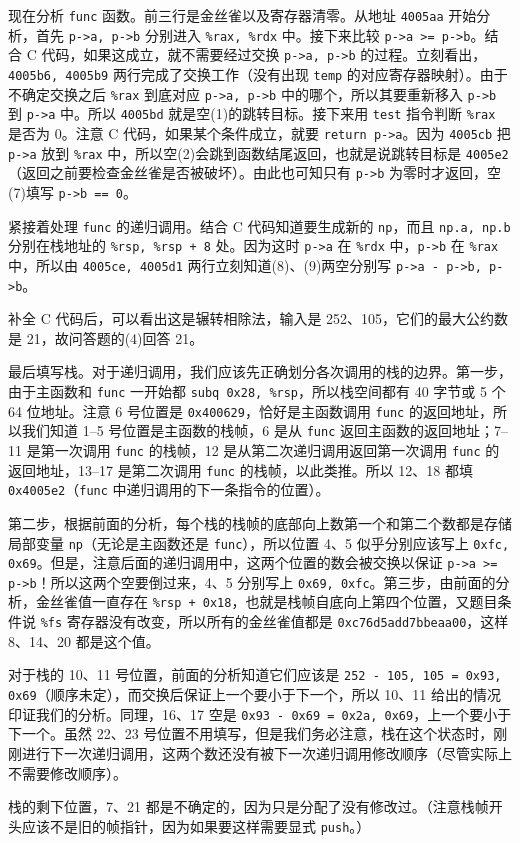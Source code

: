 \begin{problems}
        现在分析 \verb|func| 函数。前三行是金丝雀以及寄存器清零。从地址 \verb|4005aa| 开始分析，首先 \verb|p->a, p->b| 分别进入 \verb|%rax, %rdx| 中。接下来比较 \verb|p->a >= p->b|。结合 C 代码，如果这成立，就不需要经过交换 \verb|p->a, p->b| 的过程。立刻看出，\verb|4005b6, 4005b9| 两行完成了交换工作（没有出现 \verb|temp| 的对应寄存器映射）。由于不确定交换之后 \verb|%rax| 到底对应 \verb|p->a, p->b| 中的哪个，所以其要重新移入 \verb|p->b| 到 \verb|p->a| 中。所以 \verb|4005bd| 就是空(1)的跳转目标。接下来用 \verb|test| 指令判断 \verb|%rax| 是否为 0。注意 C 代码，如果某个条件成立，就要 \verb|return p->a|。因为 \verb|4005cb| 把 \verb|p->a| 放到 \verb|%rax| 中，所以空(2)会跳到函数结尾返回，也就是说跳转目标是 \verb|4005e2|（返回之前要检查金丝雀是否被破坏）。由此也可知只有 \verb|p->b| 为零时才返回，空(7)填写 \verb|p->b == 0|。

        紧接着处理 \verb|func| 的递归调用。结合 C 代码知道要生成新的 \verb|np|，而且 \verb|np.a, np.b| 分别在栈地址的 \verb|%rsp, %rsp + 8| 处。因为这时 \verb|p->a| 在 \verb|%rdx| 中，\verb|p->b| 在 \verb|%rax| 中，所以由 \verb|4005ce, 4005d1| 两行立刻知道(8)、(9)两空分别写 \verb|p->a - p->b, p->b|。

        补全 C 代码后，可以看出这是辗转相除法，输入是 252、105，它们的最大公约数是 21，故问答题的(4)回答 21。

        最后填写栈。对于递归调用，我们应该先正确划分各次调用的栈的边界。第一步，由于主函数和 \verb|func| 一开始都 \verb|subq 0x28, %rsp|，所以栈空间都有 40 字节或 5 个 64 位地址。注意 6 号位置是 \verb|0x400629|，恰好是主函数调用 \verb|func| 的返回地址，所以我们知道 1--5 号位置是主函数的栈帧，6 是从 \verb|func| 返回主函数的返回地址；7--11 是第一次调用 \verb|func| 的栈帧，12 是从第二次递归调用返回第一次调用 \verb|func| 的返回地址，13--17 是第二次调用 \verb|func| 的栈帧，以此类推。所以 12、18 都填 \verb|0x4005e2|（\verb|func| 中递归调用的下一条指令的位置）。
        
        第二步，根据前面的分析，每个栈的栈帧的底部向上数第一个和第二个数都是存储局部变量 \verb|np|（无论是主函数还是 \verb|func|），所以位置 4、5 似乎分别应该写上 \verb|0xfc, 0x69|。但是，注意后面的递归调用中，这两个位置的数会被交换以保证 \verb|p->a >= p->b|！所以这两个空要倒过来，4、5 分别写上 \verb|0x69, 0xfc|。第三步，由前面的分析，金丝雀值一直存在 \verb|%rsp + 0x18|，也就是栈帧自底向上第四个位置，又题目条件说 \verb|%fs| 寄存器没有改变，所以所有的金丝雀值都是 \verb|0xc76d5add7bbeaa00|，这样 8、14、20 都是这个值。

        对于栈的 10、11 号位置，前面的分析知道它们应该是 \verb|252 - 105, 105 = 0x93, 0x69|（顺序未定），而交换后保证上一个要小于下一个，所以 10、11 给出的情况印证我们的分析。同理，16、17 空是 \verb|0x93 - 0x69 = 0x2a, 0x69|，上一个要小于下一个。虽然 22、23 号位置不用填写，但是我们务必注意，栈在这个状态时，刚刚进行下一次递归调用，这两个数还没有被下一次递归调用修改顺序（尽管实际上不需要修改顺序）。

        栈的剩下位置，7、21 都是不确定的，因为只是分配了没有修改过。（注意栈帧开头应该不是旧的帧指针，因为如果要这样需要显式 \verb|push|。）
    \end{problems}

